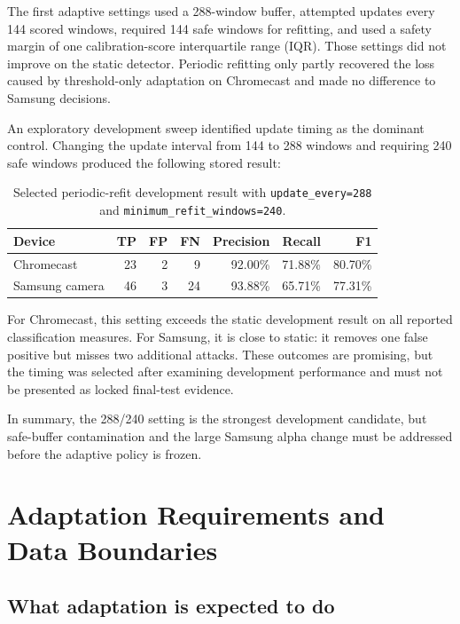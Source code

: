 \documentclass[11pt,a4paper]{article}
\begin{document}
The first adaptive settings used a 288-window buffer, attempted updates every
144 scored windows, required 144 safe windows for refitting, and used a safety
margin of one calibration-score interquartile range (IQR). Those settings did
not improve on the static detector. Periodic refitting only partly recovered
the loss caused by threshold-only adaptation on Chromecast and made no
difference to Samsung decisions.

An exploratory development sweep identified update timing as the dominant
control. Changing the update interval from 144 to 288 windows and requiring
240 safe windows produced the following stored result:

\begin{table}[ht]
\centering
\small
\begin{tabular}{lrrrrrr}
\toprule
\textbf{Device} & \textbf{TP} & \textbf{FP} & \textbf{FN} &
\textbf{Precision} & \textbf{Recall} & \textbf{F1} \\
\midrule
Chromecast & 23 & 2 & 9 & 92.00\% & 71.88\% & 80.70\% \\
Samsung camera & 46 & 3 & 24 & 93.88\% & 65.71\% & 77.31\% \\
\bottomrule
\end{tabular}
\caption{Selected periodic-refit development result with
\texttt{update\_every=288} and \texttt{minimum\_refit\_windows=240}.}
\label{tab:selected-headline}
\end{table}

For Chromecast, this setting exceeds the static development result on all
reported classification measures. For Samsung, it is close to static: it
removes one false positive but misses two additional attacks. These outcomes
are promising, but the timing was selected after examining development
performance and must not be presented as locked final-test evidence.

In summary, the 288/240 setting is the strongest development candidate, but
safe-buffer contamination and the large Samsung alpha change must be addressed
before the adaptive policy is frozen.

\section{Adaptation Requirements and Data Boundaries}

\subsection{What adaptation is expected to do}
\end{document}
